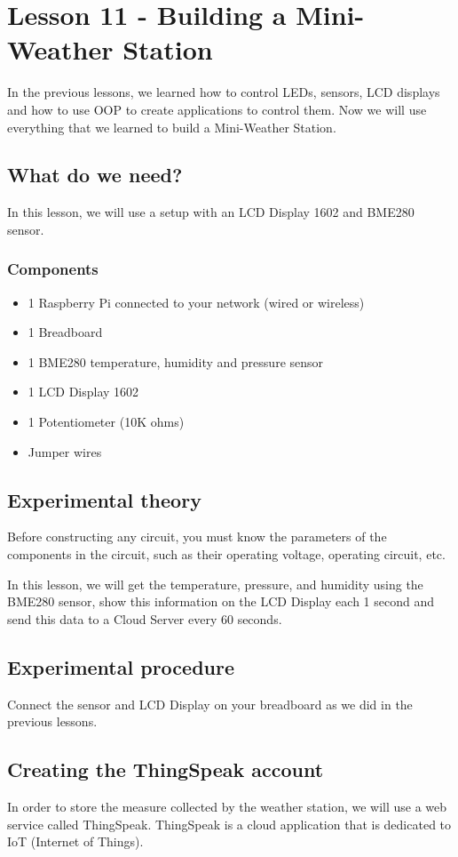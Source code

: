 \documentclass[10pt,twoside,english]{_support/latex/sbabook/sbabook}
\begin{document}
\frontmatter
\pagestyle{plain}

\tableofcontents*
\clearpage\listoffigures

\mainmatter

\chapter{Lesson 11 - Building a Mini-Weather Station}
In the previous lessons, we learned how to control LEDs, sensors, LCD displays and how to use OOP to create applications to control them. Now we will use everything that we learned to build a Mini-Weather Station. 
\section{What do we need?}
In this lesson, we will use a setup with an LCD Display 1602 and BME280 sensor.
\subsection{Components}
\begin{itemize}
\item 1 Raspberry Pi connected to your network (wired or wireless)
\item 1 Breadboard
\item 1 BME280 temperature, humidity and pressure sensor
\item 1 LCD Display 1602 
\item 1 Potentiometer (10K ohms)
\item Jumper wires
\end{itemize}
\section{Experimental theory}
Before constructing any circuit, you must know the parameters of the components in the circuit, such as their operating voltage, operating circuit, etc.

In this lesson, we will get the temperature, pressure, and humidity using the BME280 sensor, show this information on the LCD Display each 1 second and send this data to a Cloud Server every 60 seconds. 
\section{Experimental procedure}
Connect the sensor and LCD Display on your breadboard as we did in the previous lessons. 
\section{Creating the ThingSpeak account }
In order to store the measure collected by the weather station, we will use a web service called ThingSpeak. ThingSpeak is a cloud application that is dedicated to IoT (Internet of Things).
\end{document}
